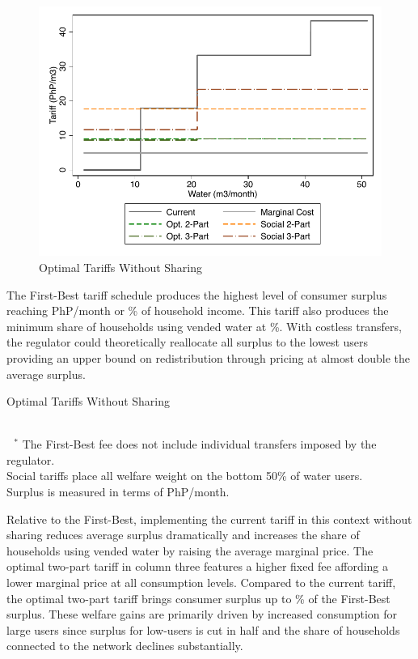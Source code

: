 \documentclass[12pt]{article}
\begin{document}
\begin{figure}[!htp]
\centering
\caption{Optimal Tariffs Without Sharing}\label{figure:optimaltariffnosharing}
\includegraphics{tables/no_shr_tariff_groups.pdf}  
\end{figure}

The First-Best tariff schedule produces the highest level of consumer surplus reaching PhP/month or \unskip\% of household income.  This tariff also produces the minimum share of households using vended water at \unskip\%.  With costless transfers, the regulator could theoretically reallocate all surplus to the lowest users providing an upper bound on redistribution through pricing at almost double the average surplus.  


\begin{table}[!hbp]
\centering
\caption{Optimal Tariffs Without Sharing}\label{table:optimaltariffnosharing}
\resizebox{\textwidth}{!}{%

}	\\
\footnotesize{$\text{ }^{*}$ The First-Best fee does not include individual transfers imposed by the regulator. \\  Social tariffs place all welfare weight on the bottom 50\% of water users. \\ Surplus is measured in terms of PhP/month.}
\end{table}





Relative to the First-Best, implementing the current tariff in this context without sharing reduces average surplus dramatically and increases the share of households using vended water by raising the average marginal price.  The optimal two-part tariff in column three features a higher fixed fee affording a lower marginal price at all consumption levels.  Compared to the current tariff, the optimal two-part tariff brings consumer surplus up to \unskip\% of the First-Best surplus.  These welfare gains are primarily driven by increased consumption for large users since surplus for low-users is cut in half and the share of households connected to the network declines substantially.
\end{document}
